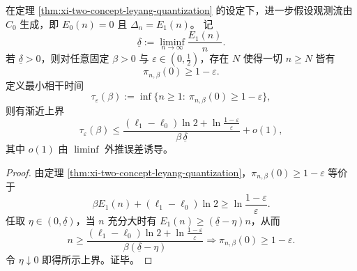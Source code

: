 \begin{corollary}\label{cor:xi-two-concept-coherence-time-density-law}
在定理 \ref{thm:xi-two-concept-leyang-quantization} 的设定下，进一步假设观测流由 \(C_0\) 生成，即 \(E_0(n)=0\) 且 \(\Delta_n=E_1(n)\)。
记
\[
\underline\delta:=\liminf_{n\to\infty}\frac{E_1(n)}{n}.
\]
若 \(\underline\delta>0\)，则对任意固定 \(\beta>0\) 与 \(\varepsilon\in(0,\tfrac12)\)，存在 \(N\) 使得一切 \(n\ge N\) 皆有
\[
\pi_{n,\beta}(0)\ge 1-\varepsilon.
\]
定义最小相干时间
\[
\tau_\varepsilon(\beta):=\inf\{n\ge 1:\ \pi_{n,\beta}(0)\ge 1-\varepsilon\},
\]
则有渐近上界
\[
\tau_\varepsilon(\beta)
\le
\frac{(\ell_1-\ell_0)\ln 2+\ln\frac{1-\varepsilon}{\varepsilon}}{\beta\,\underline\delta}
+o(1),
\]
其中 \(o(1)\) 由 \(\liminf\) 外推误差诱导。
\end{corollary}

\begin{proof}
由定理 \ref{thm:xi-two-concept-leyang-quantization}，\(\pi_{n,\beta}(0)\ge 1-\varepsilon\) 等价于
\[
\beta E_1(n)+(\ell_1-\ell_0)\ln 2
\ge
\ln\frac{1-\varepsilon}{\varepsilon}.
\]
任取 \(\eta\in(0,\underline\delta)\)，当 \(n\) 充分大时有 \(E_1(n)\ge (\underline\delta-\eta)n\)，从而
\[
n
\ge
\frac{(\ell_1-\ell_0)\ln 2+\ln\frac{1-\varepsilon}{\varepsilon}}
{\beta(\underline\delta-\eta)}
\Longrightarrow
\pi_{n,\beta}(0)\ge 1-\varepsilon.
\]
令 \(\eta\downarrow 0\) 即得所示上界。证毕。
\end{proof}

